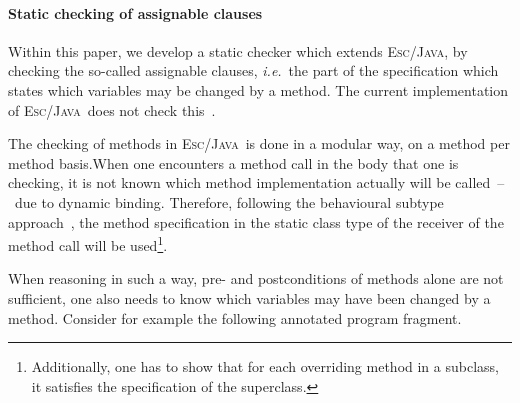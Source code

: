 \documentclass[a4paper]{llncs}
\newcommand{\jml}{\textsc{Jml}}
\newcommand{\escj}{\textsc{Esc/Java}}
\newcommand{\jass}{\textsc{Jass}}
\newcommand{\java}{\textsc{Java}}
\newcommand{\csrc}{\textsc{Compaq Src}}
\begin{document}



\paragraph{\bf{Static checking of assignable clauses}}
Within this paper, we develop a static checker which extends \escj, by
checking the so-called assignable clauses, \emph{i.e.}~the part of the
specification which states which variables may be changed by a
method. The current implementation of \escj\ does not check
this~\cite{Leino01}.

The checking of methods in \escj\ is done in a modular way, on a
method per method basis.When one encounters a method call in the body
that one is checking, it is not known which method implementation
actually will be called~--~due to dynamic binding. Therefore,
following the behavioural subtype approach~\cite{LiskovW94}, the
method specification in the static class type of the receiver of the
method call will be used\footnote{Additionally, one has to show that
for each overriding method in a subclass, it satisfies the
specification of the superclass.}.

When reasoning in such a way, pre- and postconditions of methods alone 
are not sufficient, one also needs to know which variables may have
been changed by a method. Consider for example the following annotated 
program fragment.
\end{document}
